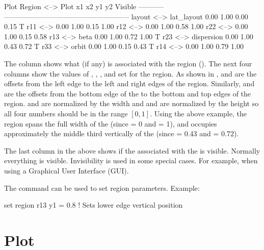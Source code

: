 {{{\begin{example}
Plot Region         <-->  Plot                 x1    x2    y1    y2     Visible
-----------               -----------------------------------------------------
layout              <-->  lat_layout          0.00  1.00  0.00  0.15         T
r11                 <-->                      0.00  1.00  0.15  1.00
r12                 <-->                      0.00  1.00  0.58  1.00
r22                 <-->                      0.00  1.00  0.15  0.58
r13                 <-->  beta                0.00  1.00  0.72  1.00         T
r23                 <-->  dispersion          0.00  1.00  0.43  0.72         T
r33                 <-->  orbit               0.00  1.00  0.15  0.43         T
r14                 <-->                      0.00  1.00  0.79  1.00
\end{example}
The  column shows what  (if any) is associated with the region
(). The next four columns show the values of , , , and 
set for the region. As shown in ,  and  are the offsets from the
left  edge to the left and right edges of the region. Similarly,  and 
are the offsets from the bottom edge of the  to the bottom and top edges of the
region.  and  are normalized by the  width and  and  are
normalized by the  height so all four numbers should be in the range $[0, 1]$.  Using
the above example, the  region spans the full width of the  (since  = 0
and  = 1), and occupies approximately the middle third vertically of the 
(since  = 0.43 and  = 0.72).

The last column in the above shows if the  associated with the  is
visible. Normally everything is visible. Invisibility is used in some special cases. For example,
when using a Graphical User Interface (GUI).

The  command can be used to set region parameters. Example:
\begin{example}
  set region r13 y1 = 0.8  ! Sets lower edge vertical position
\end{example}

\section{Plot}
\label{s:plot.def}

}}}
